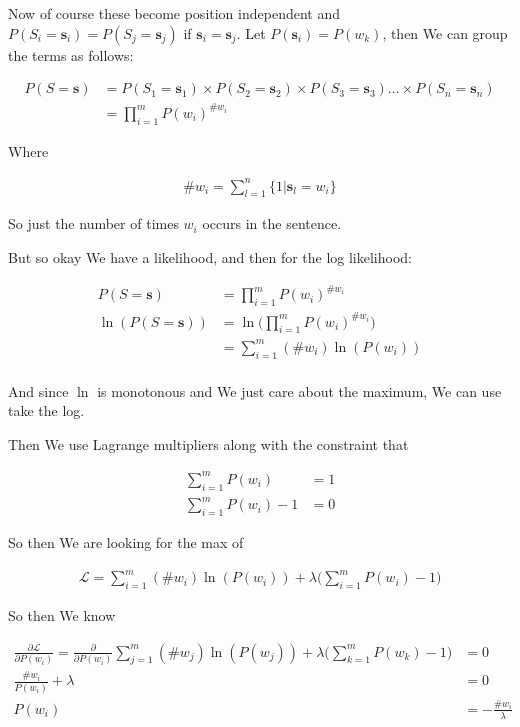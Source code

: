 \documentclass{article}
\begin{document}
		Now of course these become position independent and $P(S_i=\mathbf{s}_i) = P(S_j=\mathbf{s}_j)$ if $\mathbf{s}_i = \mathbf{s}_j$. Let $P(\mathbf{s}_i) = P(w_k)$, then We can group the terms as follows:
		
		\begin{align}
			P(S=\mathbf{s}) &= P(S_1=\mathbf{s}_1)\times P(S_2=\mathbf{s}_2)\times P(S_3=\mathbf{s}_3)\ldots \times P(S_n=\mathbf{s}_n)\\
			&= \prod^m_{i=1} P(w_i)^{\#w_i}
		\end{align}
			
		Where
		
		\begin{align}
			\# w_i = \sum^n_{l = 1} \{1|\mathbf{s}_l = w_i \}
		\end{align}
		
		So just the number of times $w_i$ occurs in the sentence.
		
		But so okay We have a likelihood, and then for the log likelihood:
		
		\begin{align}
			P(S=\mathbf{s}) &= \prod^m_{i=1} P(w_i)^{\#w_i}\\
			\ln(P(S=\mathbf{s})) &= \ln\bigg(\prod^m_{i=1} P(w_i)^{\#w_i}\bigg)\\
			&= \sum^m_{i=1} (\#w_i)\ln (P(w_i))\\
		\end{align}
		
		And since $\ln$ is monotonous and We just care about the maximum, We can use take the log.
		
		Then We use Lagrange multipliers along with the constraint that 
		
		\begin{align}
			\sum^m_{i=1} P(w_i) &= 1\\
			\sum^m_{i=1} P(w_i)-1 &= 0
		\end{align}
		
		So then We are looking for the max of 
		
		\begin{align}
			\mathcal{L}	= \sum^m_{i=1} (\#w_i)\ln (P(w_i)) + \lambda\bigg( \sum^m_{i=1} P(w_i) - 1 \bigg)
		\end{align}
		
		So then We know
		
		\begin{align}
			\frac{\partial \mathcal{L}}{\partial P(w_i)}	= \frac{\partial }{\partial P(w_i)} \sum^m_{j=1} (\#w_j)\ln (P(w_j)) + \lambda\bigg( \sum^m_{k=1} P(w_k) - 1 \bigg) &= 0\\
			\frac{\#w_i}{P(w_i)} + \lambda &= 0\\
			P(w_i)&= -\frac{\#w_i}{\lambda} 
		\end{align}
		
\end{document}
